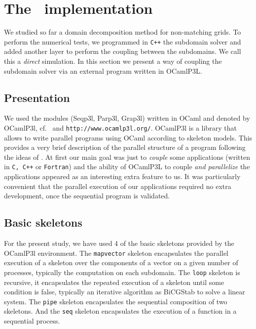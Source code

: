 \section{The \ocamlpiiil\ implementation}
%

We studied so far a domain decomposition method for non-matching grids. To
perform the numerical tests, we programmed in {\tt C++} the subdomain solver
and added another layer to perform the coupling between the subdomains. We call
this a \emph{direct} simulation. In this section we present a way of coupling
the subdomain solver via an external program written in OCamlP3L. 
\subsection{Presentation}
We used the modules (Seqp3l, Parp3l, Grap3l) written in OCaml and denoted by
OCamlP3l, cf.~\cite{Ocamlp3lMlw98} and {\tt http://www.ocamlp3l.org/}.
OCamlP3l is a library that allows to write parallel programs using OCaml
according to skeleton models. This provides a very brief description of the
parallel structure of a program following the ideas of \cite{skeletoncole89}.
At first our main goal was just to {\it couple} some applications (written in
{\tt C, C++} or {\tt Fortran}) and the ability of OCamlP3L to couple {\it and
  parallelize} the applications appeared as an interesting extra feature to us.
It was particularly convenient that the parallel execution of our applications
required no extra development, once the sequential program is validated.

\subsection{Basic skeletons}

For the present study, we have used 4 of the basic skeletons provided by the
OCamlP3l environment.  The {\tt mapvector} skeleton encapsulates the parallel
execution of a skeleton over the components of a vector on a given number of
processes, typically the computation on each subdomain.  The {\tt loop}
skeleton is recursive, it encapsulates the repeated execution of a skeleton
until some condition is false, typically an iterative algorithm as BiCGStab to
solve a linear system.  The {\tt pipe} skeleton encapsulates the sequential
composition of two skeletons.  And the {\tt seq} skeleton encapsulates the
execution of a function in a sequential process.

